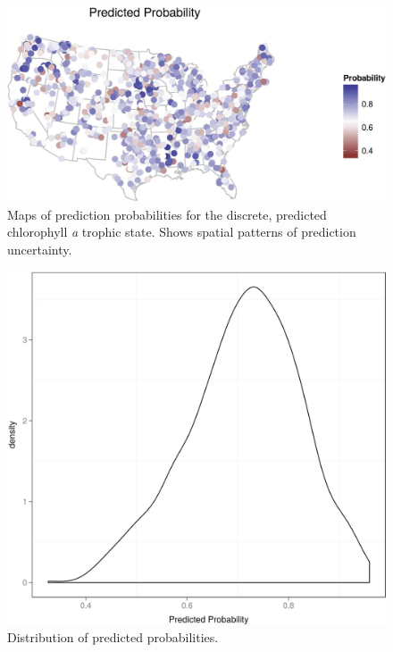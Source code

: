 \documentclass[11pt,]{article}
\begin{document}
\begin{figure}[htbp]
\centering
\includegraphics{manuscript_files/figure-latex/predicted_prob_map-1.jpeg}
\caption{Maps of prediction probabilities for the discrete, predicted
chlorophyll \textit{a} trophic state. Shows spatial patterns of
prediction uncertainty. \label{fig:predicted_prob_map}}
\end{figure}

\newpage

\begin{figure}[htbp]
\centering
\includegraphics{manuscript_files/figure-latex/pred_prob_dist-1.jpeg}
\caption{Distribution of predicted probabilities.
\label{fig:pred_prob_dist}}
\end{figure}

\newpage
\end{document}
